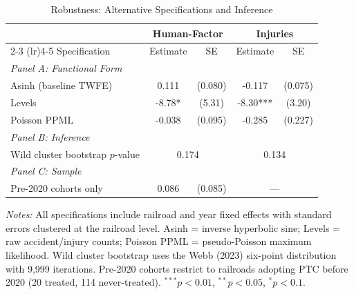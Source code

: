 \begin{table}[!t]
\centering
\caption{Robustness: Alternative Specifications and Inference}
\label{tab:robustness}
\small
\begin{tabular}{lcccc}
\toprule
& \multicolumn{2}{c}{Human-Factor} & \multicolumn{2}{c}{Injuries} \\
\cmidrule(lr){2-3} \cmidrule(lr){4-5}
Specification & Estimate & SE & Estimate & SE \\
\midrule
\textit{Panel A: Functional Form} \\
\quad Asinh (baseline TWFE) & 0.111 & (0.080) & -0.117 & (0.075) \\
\quad Levels & -8.78* & (5.31) & -8.30*** & (3.20) \\
\quad Poisson PPML & -0.038 & (0.095) & -0.285 & (0.227) \\
\addlinespace
\textit{Panel B: Inference} \\
\quad Wild cluster bootstrap $p$-value & \multicolumn{2}{c}{0.174} & \multicolumn{2}{c}{0.134} \\
\addlinespace
\textit{Panel C: Sample} \\
\quad Pre-2020 cohorts only & 0.086 & (0.085) & \multicolumn{2}{c}{---} \\
\bottomrule
\end{tabular}
\par\vspace{0.3em}
\parbox{\textwidth}{\footnotesize
\textit{Notes:} All specifications include railroad and year fixed effects with standard errors clustered at the railroad level. Asinh = inverse hyperbolic sine; Levels = raw accident/injury counts; Poisson PPML = pseudo-Poisson maximum likelihood. Wild cluster bootstrap uses the Webb (2023) six-point distribution with 9,999 iterations. Pre-2020 cohorts restrict to railroads adopting PTC before 2020 (20 treated, 114 never-treated).
$^{***}p<0.01$, $^{**}p<0.05$, $^{*}p<0.1$.
}
\end{table}
